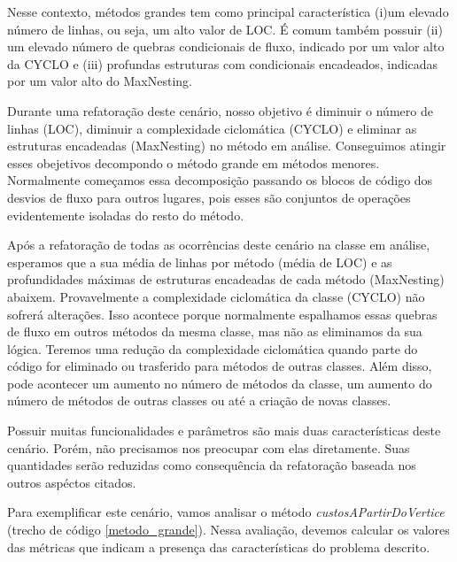 Nesse contexto, métodos grandes tem como principal característica (i)um elevado número de linhas, ou seja, um alto valor de LOC. É comum também possuir (ii) um elevado número de quebras condicionais de fluxo, indicado por um valor alto da CYCLO e (iii) profundas estruturas com condicionais encadeados, indicadas por um valor alto do MaxNesting.
                                               
Durante uma refatoração deste cenário, nosso objetivo é diminuir o número de linhas (LOC), diminuir a complexidade ciclomática (CYCLO) e eliminar as estruturas encadeadas (MaxNesting) no método em análise. Conseguimos atingir esses obejetivos decompondo o método grande em métodos menores. Normalmente começamos essa decomposição passando os blocos de código dos desvios de fluxo para outros lugares, pois esses são conjuntos de operações evidentemente isoladas do resto do método.
                                                
Após a refatoração de todas as ocorrências deste cenário na classe em análise, esperamos que a sua média de linhas por método (média de LOC) e as profundidades máximas de estruturas encadeadas de cada método (MaxNesting) abaixem. Provavelmente a complexidade ciclomática da classe (CYCLO) não sofrerá alterações. Isso acontece porque normalmente espalhamos essas quebras de fluxo em outros métodos da mesma classe, mas não as eliminamos da sua lógica. Teremos uma redução da complexidade ciclomática quando parte do código for eliminado ou trasferido para métodos de outras classes. Além disso, pode acontecer um aumento no número de métodos da classe, um aumento do número de métodos de outras classes ou até a criação de novas classes.

Possuir muitas funcionalidades e parâmetros são mais duas características deste cenário. Porém, não precisamos nos preocupar com elas diretamente. Suas quantidades serão reduzidas como consequência da refatoração baseada nos outros aspéctos citados.

Para exemplificar este cenário, vamos analisar o método \textit{custosAPartirDoVertice} (trecho de código \ref{metodo_grande}). Nessa avaliação, devemos calcular os valores das métricas que indicam a presença das características do problema descrito. 
                                                                                                                         
                                                            

